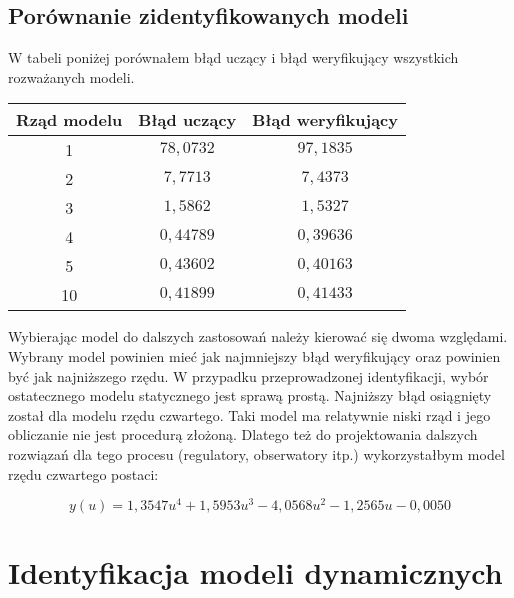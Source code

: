 \documentclass[a4paper,titlepage,11pt,floatssmall]{mwrep}
\begin{document}
\newpage

\subsection{Porównanie zidentyfikowanych modeli}

W tabeli poniżej porównałem błąd uczący i błąd weryfikujący wszystkich rozważanych modeli.
\bigskip
\begin{center}


\begin{tabular}{|c|c|c|}
  \hline 
  Rząd modelu & Błąd uczący & Błąd weryfikujący \\
  \hline
  1 & $78,0732$ & $97,1835$ \\
  \hline
  2 & $7,7713$ & $7,4373$ \\
  \hline
  3 & $1,5862$ & $1,5327$ \\
  \hline
  4 & $0,44789$ & $0,39636$ \\
  \hline
  5 & $0,43602$ & $0,40163$ \\
  \hline
  10 & $0,41899$ & $0,41433$ \\
  \hline
\end{tabular} 
\end{center}

\bigskip
Wybierając model do dalszych zastosowań należy kierować się dwoma względami. Wybrany model powinien mieć jak najmniejszy błąd weryfikujący oraz powinien być jak najniższego rzędu. W przypadku przeprowadzonej identyfikacji, wybór ostatecznego modelu statycznego jest sprawą prostą. Najniższy błąd osiągnięty został dla modelu rzędu czwartego. Taki model ma relatywnie niski rząd i jego obliczanie nie jest procedurą złożoną. Dlatego też do projektowania dalszych rozwiązań dla tego procesu (regulatory, obserwatory itp.) wykorzystałbym model rzędu czwartego postaci: 

\begin{equation*}
y(u) = 1,3547u^4 + 1,5953u^3 - 4,0568u^2 - 1,2565u - 0, 0050
\end{equation*}

\newpage
\section{Identyfikacja modeli dynamicznych}
\end{document}
